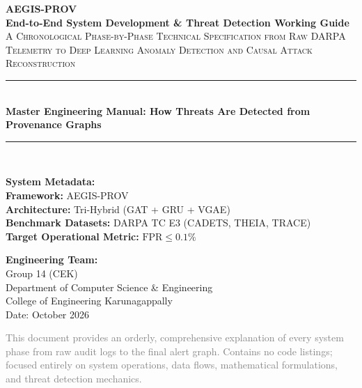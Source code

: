 \documentclass[11pt,a4paper]{report}
\begin{document}
\begin{titlepage}
\centering
\vspace*{1.0cm}

{\Huge\bfseries\textcolor{secNavy}{AEGIS-PROV}}\\[0.4cm]
{\Large\bfseries\textcolor{secBlue}{End-to-End System Development \& Threat Detection Working Guide}}\\[0.5cm]
{\large\textsc{A Chronological Phase-by-Phase Technical Specification from Raw DARPA Telemetry to Deep Learning Anomaly Detection and Causal Attack Reconstruction}}\\[1.2cm]

\rule{\linewidth}{1.2pt}\\[0.4cm]
{\LARGE\bfseries Master Engineering Manual: How Threats Are Detected from Provenance Graphs}\\[0.3cm]
\rule{\linewidth}{1.2pt}\\[1.5cm]

\begin{minipage}[t]{0.48\textwidth}
\raggedright
\textbf{\large System Metadata:}\\
\textbf{Framework:} AEGIS-PROV\\
\textbf{Architecture:} Tri-Hybrid (GAT + GRU + VGAE)\\
\textbf{Benchmark Datasets:} DARPA TC E3 (CADETS, THEIA, TRACE)\\
\textbf{Target Operational Metric:} $\text{FPR} \le 0.1\%$
\end{minipage}
\hfill
\begin{minipage}[t]{0.48\textwidth}
\raggedleft
\textbf{\large Engineering Team:}\\
Group 14 (CEK)\\
Department of Computer Science \& Engineering\\
College of Engineering Karunagappally\\
Date: October 2026
\end{minipage}

\vfill
{\small\textcolor{gray}{This document provides an orderly, comprehensive explanation of every system phase from raw audit logs to the final alert graph. Contains no code listings; focused entirely on system operations, data flows, mathematical formulations, and threat detection mechanics.}}
\end{titlepage}

\tableofcontents
\newpage

\end{document}
